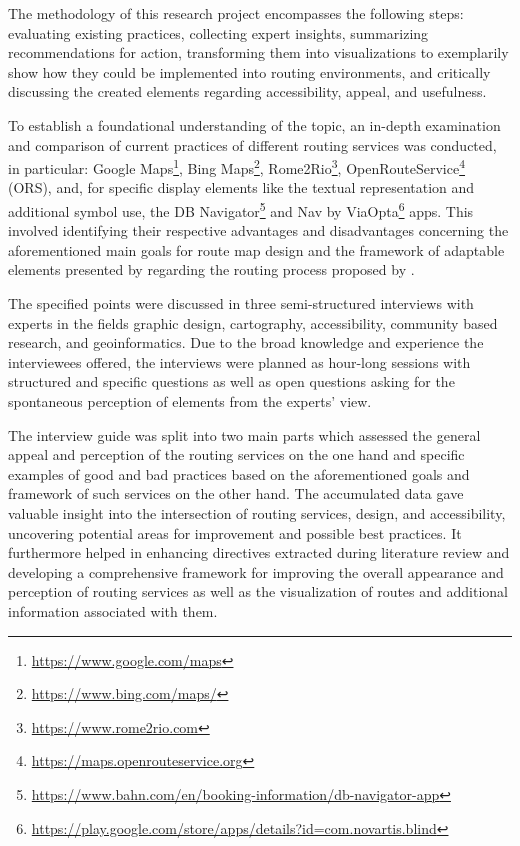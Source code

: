 \documentclass[agile, final]{copernicus-agile}
\begin{document}
The methodology of this research project encompasses the following steps: evaluating existing practices, collecting expert insights, summarizing recommendations for action, transforming them into visualizations to exemplarily show how they could be implemented into routing environments, and critically discussing the created elements regarding accessibility, appeal, and usefulness.

To establish a foundational understanding of the topic, an in-depth examination and comparison of current practices of different routing services was conducted, in particular: 
Google Maps\footnote{\url{https://www.google.com/maps}}, 
Bing Maps\footnote{\url{https://www.bing.com/maps/}}, 
Rome2Rio\footnote{\url{https://www.rome2rio.com}},
OpenRouteService\footnote{\url{https://maps.openrouteservice.org}} (ORS),
and, for specific display elements like the textual representation and additional symbol use,
the DB Navigator\footnote{\url{https://www.bahn.com/en/booking-information/db-navigator-app}} 
and Nav by ViaOpta\footnote{\url{https://play.google.com/store/apps/details?id=com.novartis.blind}} apps.
This involved identifying their respective advantages and disadvantages concerning the aforementioned main goals for route map design and the framework of adaptable elements presented by \citet{AgrawalaStolte2000} regarding the routing process proposed by \citet{Delikostidis2011}.

The specified points were discussed in three semi-structured interviews with experts in the fields graphic design, cartography, accessibility, community based research, and geoinformatics. Due to the broad knowledge and experience the interviewees offered, the interviews were planned as hour-long sessions with structured and specific questions as well as open questions asking for the spontaneous perception of elements from the experts' view.

The interview guide was split into two main parts which assessed the general appeal and perception of the routing services on the one hand and specific examples of good and bad practices based on the aforementioned goals and framework of such services on the other hand. The accumulated data gave valuable insight into the intersection of routing services, design, and accessibility, uncovering potential areas for improvement and possible best practices. It furthermore helped in enhancing directives extracted during literature review and developing a comprehensive framework for improving the overall appearance and perception of routing services as well as the visualization of routes and additional information associated with them.
\end{document}
